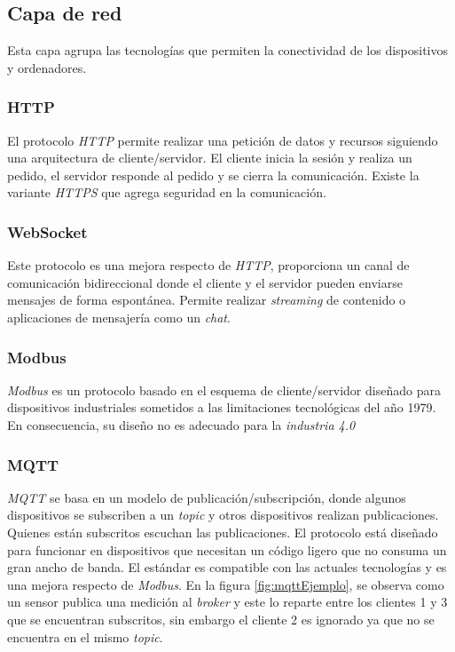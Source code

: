 	\subsection{Capa de red}
	\label{capaRed}
	
		Esta capa agrupa las tecnologías que permiten la conectividad de los dispositivos y ordenadores.
	
		\subsubsection{HTTP}
		
			El protocolo \emph{HTTP} permite realizar una petición de datos y recursos siguiendo una arquitectura de cliente/servidor. El cliente inicia la sesión y realiza un pedido, el servidor responde al pedido y se cierra la comunicación. Existe la variante \emph{HTTPS} que agrega seguridad en la comunicación.
		
		\subsubsection{WebSocket}
		
			Este protocolo es una mejora respecto de \emph{HTTP}, proporciona un canal de comunicación bidireccional donde el cliente y el servidor pueden enviarse mensajes de forma espontánea. Permite realizar \emph{streaming} de contenido o aplicaciones de mensajería como un \emph{chat}.
		
		\subsubsection{Modbus}
		
			\emph{Modbus} es un protocolo basado en el esquema de cliente/servidor diseñado para dispositivos industriales sometidos a las limitaciones tecnológicas del año 1979. En consecuencia, su diseño no es adecuado para la \emph{industria 4.0}
		
		\subsubsection{MQTT}
		
			\emph{MQTT} se basa en un modelo de publicación/subscripción, donde algunos dispositivos se subscriben a un \emph{topic} y otros dispositivos realizan publicaciones. Quienes están subscritos escuchan las publicaciones. El protocolo está diseñado para funcionar en dispositivos que necesitan un código ligero que no consuma un gran ancho de banda. El estándar es compatible con las actuales tecnologías y es una mejora respecto de \emph{Modbus}. En la figura \ref{fig:mqttEjemplo}, se observa como un sensor publica una medición al \emph{broker} y este lo reparte entre los clientes 1 y 3 que se encuentran subscritos, sin embargo el cliente 2 es ignorado ya que no se encuentra en el mismo \emph{topic}.
						

